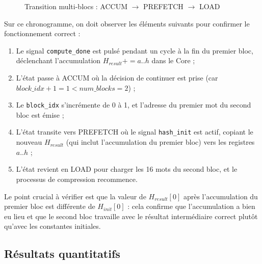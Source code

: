 \begin{figure}[H]
\centering
%
\caption{Transition multi-blocs : ACCUM $\rightarrow$ PREFETCH $\rightarrow$ LOAD}
\label{fig:waveform_multiblock}
\end{figure}

Sur ce chronogramme, on doit observer les éléments suivants pour confirmer le fonctionnement correct :

\begin{enumerate}
    \item Le signal \texttt{compute\_done} est pulsé pendant un cycle à la fin du premier bloc, déclenchant l'accumulation $H_{result} += a..h$ dans le Core ;
    \item L'état passe à ACCUM où la décision de continuer est prise (car $block\_idx + 1 = 1 < num\_blocks = 2$) ;
    \item Le \texttt{block\_idx} s'incrémente de 0 à 1, et l'adresse du premier mot du second bloc est émise ;
    \item L'état transite vers PREFETCH où le signal \texttt{hash\_init} est actif, copiant le nouveau $H_{result}$ (qui inclut l'accumulation du premier bloc) vers les registres $a..h$ ;
    \item L'état revient en LOAD pour charger les 16 mots du second bloc, et le processus de compression recommence.
\end{enumerate}

Le point crucial à vérifier est que la valeur de $H_{result}[0]$ après l'accumulation du premier bloc est différente de $H_{init}[0]$ : cela confirme que l'accumulation a bien eu lieu et que le second bloc travaille avec le résultat intermédiaire correct plutôt qu'avec les constantes initiales.

\subsection{Résultats quantitatifs}

